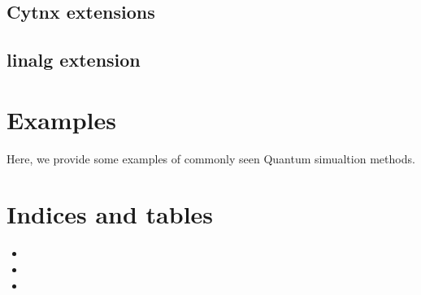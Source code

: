 \documentclass[letterpaper,10pt,english]{sphinxmanual}
\begin{document}
\section{Cytnx extensions}
\label{\detokenize{guide/cyx:cytnx-extensions}}\label{\detokenize{guide/cyx::doc}}

\section{linalg extension}
\label{\detokenize{guide/xlinalg:linalg-extension}}\label{\detokenize{guide/xlinalg::doc}}

\chapter{Examples}
\label{\detokenize{Examples:examples}}\label{\detokenize{Examples::doc}}
Here, we provide some examples of commonly seen Quantum simualtion methods.


\chapter{Indices and tables}
\label{\detokenize{index:indices-and-tables}}\begin{itemize}
\item {} 

\item {} 

\item {} 

\end{itemize}



\renewcommand{\indexname}{Index}
\printindex
\end{document}
